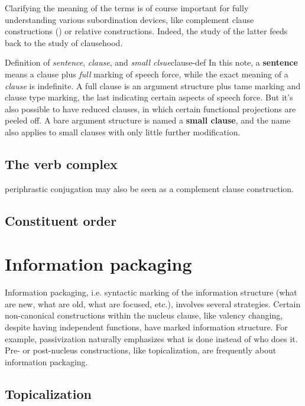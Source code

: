 \documentclass[UTF8, a4paper, oneside, scheme=plain]{ctexart}
\newcommand*{\concept}[1]{\textbf{#1}}
\newcommand*{\term}[1]{\emph{#1}}
\begin{document}
Clarifying the meaning of the terms is of course important for fully understanding various subordination devices,
like complement clause constructions () 
or relative constructions.
Indeed, the study of the latter feeds back to the study of clausehood.

\begin{infobox}{Definition of \term{sentence}, \term{clause}, and \term{small clsue}}{clause-def}
    In this note, a \concept{sentence} means a clause plus \emph{full} marking of speech force,
    while the exact meaning of a \term{clause} is indefinite.
    A full clause is an argument structure plus \ac{tame} marking and clause type marking,
    the last indicating certain aspects of speech force.
    But it's also possible to have reduced clauses,
    in which certain functional projections are peeled off.
    A bare argument structure is named a \concept{small clause},
    and the name also applies to small clauses with only little further modification.
\end{infobox}

\subsection{The verb complex}

periphrastic conjugation may also be seen as a complement clause construction. %

\subsection{Constituent order}


\section{Information packaging}

Information packaging, i.e. syntactic marking of the information structure
(what are new, what are old, what are focused, etc.),
involves several strategies.
Certain non-canonical constructions within the nucleus clause, 
like valency changing, 
despite having independent functions,
have marked information structure.
For example, passivization naturally emphasizes what is done instead of who does it.
Pre- or post-nucleus constructions,
like topicalization, 
are frequently about information packaging.


\subsection{Topicalization}
\end{document}
